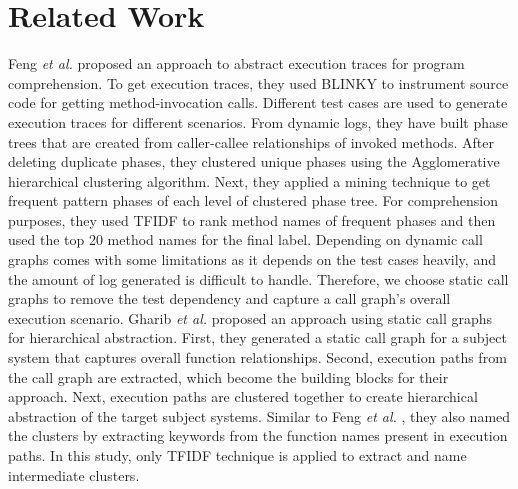 \section{Related Work}
\label{relatedwork}
Feng \textit{et al.} \cite{feng2018dynamic} proposed an approach to abstract execution traces for program comprehension. To get execution traces, they used BLINKY to instrument source code for getting method-invocation calls. Different test cases are used to generate execution traces for different scenarios. From dynamic logs, they have built phase trees that are created from caller-callee relationships of invoked methods. After deleting duplicate phases, they clustered unique phases using the Agglomerative hierarchical clustering algorithm. Next, they applied a mining technique to get frequent pattern phases of each level of clustered phase tree. For comprehension purposes, they used TFIDF to rank method names of frequent phases and then used the top 20 method names for the final label. Depending on dynamic call graphs comes with some limitations as it depends on the test cases heavily, and the amount of log generated is difficult to handle. Therefore, we choose static call graphs to remove the test dependency and capture a call graph's overall execution scenario. Gharib \textit{et al.}  \cite{gharibi2018automatic} proposed an approach using static call graphs for hierarchical abstraction. First, they generated a static call graph for a subject system that captures overall function relationships. Second, execution paths from the call graph are extracted, which become the building blocks for their approach. Next, execution paths are clustered together to create hierarchical abstraction of the target subject systems. Similar to Feng \textit{et al.}  \cite{feng2018dynamic}, they also named the clusters by extracting keywords from the function names present in execution paths. In this study, only TFIDF technique is applied to extract and name intermediate clusters.

